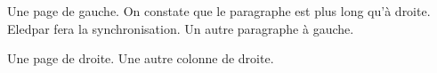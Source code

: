 \begin{pages}
  \begin{Leftside}
    \beginnumbering
    \pstart
    Une page de gauche.
    On constate que le paragraphe est plus long qu'à droite.
    Eledpar fera la synchronisation.
    \pend
    \pstart
    Un autre paragraphe à gauche.
    \pend
    \endnumbering
  \end{Leftside}
  \begin{Rightside}
    \beginnumbering
    \pstart
    Une page de droite.
    \pend
    \pstart
    Une autre colonne de droite.
    \pend
    \endnumbering
  \end{Rightside}
\end{pages}
\Pages
